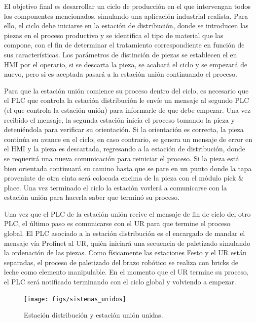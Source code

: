 El objetivo final es desarrollar un ciclo de producción en el que intervengan todos los componentes mencionados, simulando una aplicación industrial realista. Para ello, el ciclo debe iniciarse en la estación de distribución, donde se introducen las piezas en el proceso productivo y se identifica el tipo de material que las compone, con el fin de determinar el tratamiento correspondiente en función de sus características. Los parámetros de distinción de piezas se establecen el en HMI por el operario, si se descarta la pieza, se acabará el ciclo y se empezará de nuevo, pero si es aceptada pasará a la estación unión continuando el proceso. 

Para que la estación unión comience su proceso dentro del ciclo, es necesario que el PLC que controla la estación distribución le envíe un mensaje al segundo PLC (el que controla la estación unión) para informarle de que debe empezar.  Una vez recibido el mensaje, la segunda estación inicia el proceso tomando la pieza y deteniéndola para verificar su orientación. Si la orientación es correcta, la pieza continúa su avance en el ciclo; en caso contrario, se genera un mensaje de error en el HMI y la pieza es descartada, regresando a la estación de distribución, donde se requerirá una nueva comunicación para reiniciar el proceso. Si la pieza está bien orientada continuará su camino hasta que se pare en un punto donde la tapa proveninte de otra cinta será colocada encima de la pieza con el módulo pick \& place. Una vez terminado el ciclo la estación vovlerá a comunicarse con la estación unión para hacerla saber que terminó su proceso.

Una vez que el PLC de la estación unión recive el mensaje de fin de ciclo del otro PLC, el último paso es comunicarse con el UR para que termine el proceso global. El PLC asociado a la estación distribución es el encargado de mandar el mensaje vía Profinet al UR, quién iniciará una secuencia de paletizado simulando la ordenación de las piezas. Como físicamente las estaciones Festo y el UR están separadas, el proceso de paletizado del brazo robótico se realiza con bricks de leche como elemento manipulable. En el momento que el UR termine su proceso, el PLC será notificado terminando con el ciclo global y volviendo a empezar.

\clearpage

\begin{figure}[h!]
  \begin{center}
    \texttt{[image: figs/sistemas\_unidos]}
  \end{center}
  \caption{\centering Estación distribución y estación unión unidas.}
  \label{fig:sistemas_unidos}
\end{figure}



